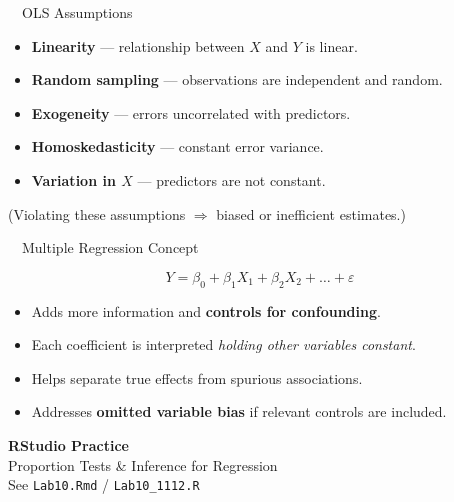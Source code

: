 \documentclass[aspectratio=169,11pt]{beamer}
\begin{document}
\begin{frame}{\ \ OLS Assumptions}
  \begin{itemize}
    \item \textbf{Linearity} --- relationship between $X$ and $Y$ is linear.
    \item \textbf{Random sampling} --- observations are independent and random.
    \item \textbf{Exogeneity} --- errors uncorrelated with predictors.
    \item \textbf{Homoskedasticity} --- constant error variance.
    \item \textbf{Variation in $X$} --- predictors are not constant.
  \end{itemize}
  \vspace{0.6em}
  \begin{center}
    {\color{qrgray}\small (Violating these assumptions $\Rightarrow$ biased or
    inefficient estimates.)}
  \end{center}
\end{frame}

\begin{frame}{\ \ Multiple Regression Concept}
  \begin{keybox}[Model]
    \begin{equation*}
      Y = \beta_0 + \beta_1 X_1 + \beta_2 X_2 + \dots + \varepsilon
    \end{equation*}
  \end{keybox}
  \vspace{0.4em}
  \begin{itemize}
    \item Adds more information and \textbf{controls for confounding}.
    \item Each coefficient is interpreted \emph{holding other variables constant}.
    \item Helps separate true effects from spurious associations.
    \item Addresses \textbf{omitted variable bias} if relevant controls are included.
  \end{itemize}
\end{frame}

{
\begin{frame}
  \vfill
  \centering
  {\color{qrnavy}\Huge\bfseries RStudio Practice}\\[0.8em]
  {\color{qrblue}\large Proportion Tests \& Inference for Regression}\\[0.4em]
  {\color{qrgray} See \texttt{Lab10.Rmd} / \texttt{Lab10\_1112.R}}
  \vfill
\end{frame}
}
\end{document}

